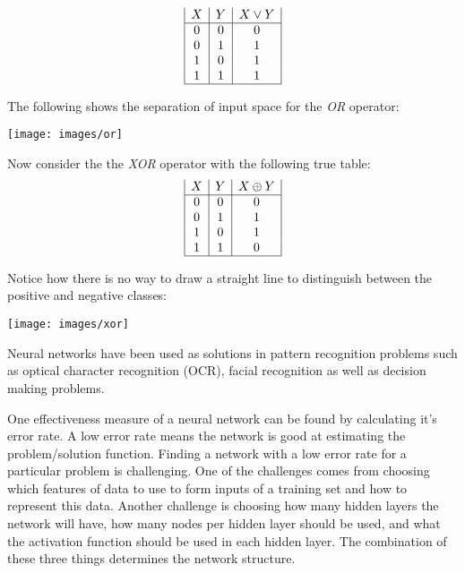 \begin{displaymath}
\begin{array}{|c|c|c|}
   X
 & Y
 & X \lor Y
\\
\hline
0 & 0 & 0\\
0 & 1 & 1\\
1 & 0 & 1\\
1 & 1 & 1\\
\hline
\end{array}
\end{displaymath}

The following shows the separation of input space for the {\it OR} operator:

\texttt{[image: images/or]}

Now consider the the {\it XOR} operator with the following true table:
\begin{displaymath}
\begin{array}{|c|c|c|}
   X
 & Y
 & X \oplus Y
\\
\hline
0 & 0 & 0\\
0 & 1 & 1\\
1 & 0 & 1\\
1 & 1 & 0\\
\hline
\end{array}
\end{displaymath}

Notice how there is no way to draw a straight line to distinguish between the positive and negative classes:

\texttt{[image: images/xor]}



Neural networks have been used as solutions in pattern recognition problems such as optical character recognition (OCR)\cite{ocr1,ocr2}, facial recognition\cite{face} as well as decision making problems\cite{decisionMaking1,decisionMaking2}.

One effectiveness measure of a neural network can be found by calculating it's error rate. A low error rate means the network is good at estimating the problem/solution function. Finding a network with a low error rate for a particular problem is challenging. One of the challenges comes from choosing which features of data to use to form inputs of a training set and how to represent this data. Another challenge is choosing how many hidden layers the network will have, how many nodes per hidden layer should be used, and what the activation function should be used in each hidden layer. The combination of these three things determines the network structure. 



